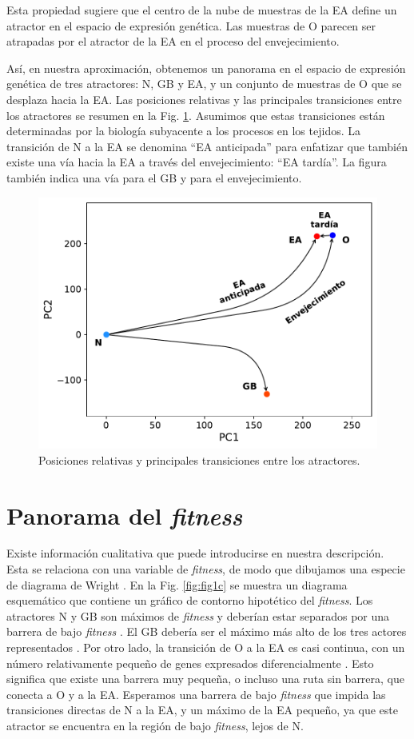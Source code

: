 Esta propiedad sugiere que el centro de la nube de muestras de la EA define un atractor en el espacio de expresión genética. Las muestras de O parecen ser atrapadas por el atractor de la EA en el proceso del envejecimiento.

Así, en nuestra aproximación, obtenemos un panorama en el espacio de expresión genética de tres atractores: N, GB y EA, y un conjunto de muestras de O que se desplaza hacia la EA. Las posiciones relativas y las principales transiciones entre los atractores se resumen en la Fig. \ref{fig:fig1b}. Asumimos que estas transiciones están determinadas por la biología subyacente a los procesos en los tejidos. La transición de N a la EA se denomina ``EA anticipada'' para enfatizar que también existe una vía hacia la EA a través del envejecimiento: ``EA tardía''. La figura también indica una vía para el GB y para el envejecimiento.

\begin{figure}[!htb]
	\centering
	\includegraphics[width=0.75\linewidth]{figures/Fig_1b.pdf}
	\caption{Posiciones relativas y principales transiciones entre los atractores.}
	\label{fig:fig1b}
\end{figure}

\section{Panorama del \textit{fitness}}\label{sec:sec22}

Existe información cualitativa que puede introducirse en nuestra descripción. Esta se relaciona con una variable de \emph{fitness}, de modo que dibujamos una especie de diagrama de Wright \cite{wright1932roles}. En la Fig. \ref{fig:fig1c} se muestra un diagrama esquemático que contiene un gráfico de contorno hipotético del \emph{fitness}. Los atractores N y GB son máximos de \emph{fitness} y deberían estar separados por una barrera de bajo \emph{fitness} \cite{Gonzalez_2021}. El GB debería ser el máximo más alto de los tres actores representados \cite{Gonzalez_2021, gonzalez2022estimating}. Por otro lado, la transición de O a la EA es casi continua, con un número relativamente pequeño de genes expresados diferencialmente \cite{Gonzalez_2021}. Esto significa que existe una barrera muy pequeña, o incluso una ruta sin barrera, que conecta a O y a la EA. Esperamos una barrera de bajo \emph{fitness} que impida las transiciones directas de N a la EA, y un máximo de la EA pequeño, ya que este atractor se encuentra en la región de bajo \emph{fitness}, lejos de N. 

